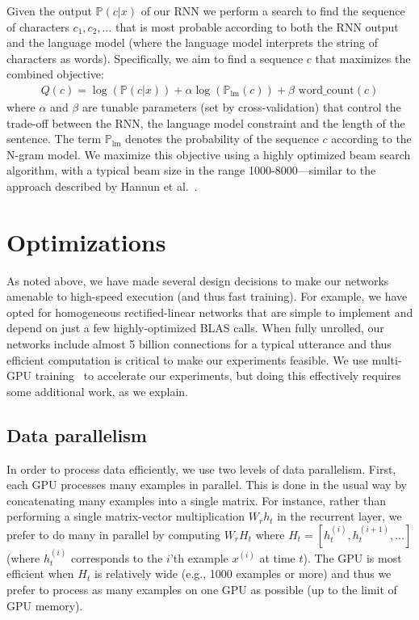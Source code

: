 \documentclass{article}
\begin{document}
Given the output $\mathbb{P}(c|x)$ of our RNN we perform a search to find the sequence of characters $c_1,c_2,\ldots$ that is most probable according to both the RNN output and the language model (where the language model interprets the string of characters as words). Specifically, we aim to find a sequence $c$ that maximizes the combined objective:
\begin{align*}
Q(c) = \log(\mathbb{P}(c|x)) + \alpha \log(\mathbb{P}_{\text{lm}}(c)) + \beta \textrm{ word\_count}(c)
\end{align*}
where $\alpha$ and $\beta$ are tunable parameters (set by cross-validation) that control the trade-off between the RNN, the language model constraint and the length of the sentence.  The term $\mathbb{P}_{\text{lm}}$ denotes the probability of the sequence $c$ according to the N-gram model.  We maximize this objective using a highly optimized beam search algorithm, with a typical beam size in the range 1000-8000---similar to the approach described by Hannun et al.~\cite{hannun2014firstpass}.

\section{Optimizations}
\label{section:optimization}

As noted above, we have made several design decisions to make
our networks amenable to high-speed execution (and thus fast training).
For example, we have opted for homogeneous rectified-linear networks
that are simple to implement and depend on just a few highly-optimized BLAS
calls.  When fully unrolled, our networks include almost 5 billion connections
for a typical utterance and thus efficient computation is critical to 
make our experiments feasible.  We use multi-GPU 
training~\cite{coates2013cotshpc,krizhevsky2012imagenet} to accelerate our 
experiments, but doing this effectively requires some additional work, as we 
explain.

\subsection{Data parallelism}
\label{section:datapar}

In order to process data efficiently, we use two levels of data parallelism.  First, each GPU processes many examples in parallel.  This is done in the usual way by concatenating many examples into a single matrix.  For instance, rather than performing a single matrix-vector multiplication $W_r h_t$ in the recurrent layer, we prefer to do many in parallel by computing $W_r H_t$ where $H_t = [ h^{(i)}_{t}, h^{(i+1)}_{t}, \ldots ]$ 
(where $h_t^{(i)}$ corresponds to the $i$'th example $x^{(i)}$ at time $t$).  The GPU is most
efficient when $H_t$ is relatively wide (e.g., 1000 examples or more) and thus we prefer to process as many
examples on one GPU as possible (up to the limit of GPU memory).
\end{document}
